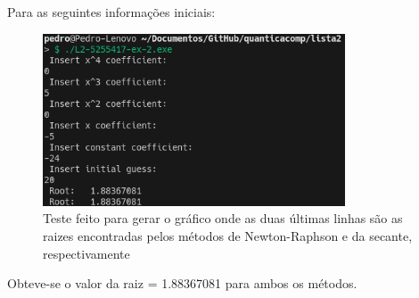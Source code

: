 \documentclass[12pt, a4paper]{article} %
\begin{document}
            Para as seguintes informa\c{c}\~oes iniciais:
            \begin{figure}[H]
                \centering
                \includegraphics[width=0.8\textwidth]{../images/results-ex-2.2-20.png}
                \caption{Teste feito para gerar o gr\'afico onde as duas \'ultimas linhas s\~ao as raizes encontradas pelos m\'etodos de Newton-Raphson e da secante, respectivamente}
            \end{figure}
            Obteve-se o valor da raiz = 1.88367081 para ambos os m\'etodos.
\end{document}
